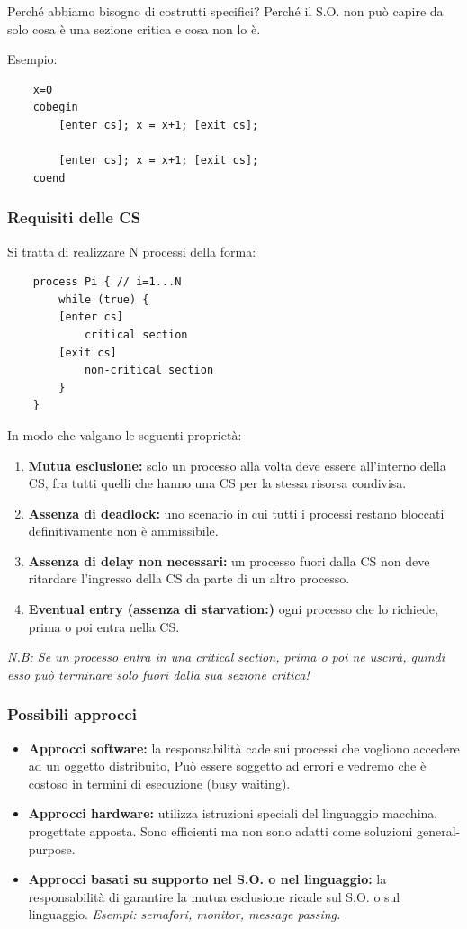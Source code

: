 Perché abbiamo bisogno di costrutti specifici? Perché il S.O. non può capire da solo cosa è una sezione critica e cosa non lo è.

Esempio:
\begin{lstlisting}
    x=0
    cobegin
        [enter cs]; x = x+1; [exit cs];

        [enter cs]; x = x+1; [exit cs];
    coend
\end{lstlisting}

\subsubsection{Requisiti delle CS}
Si tratta di realizzare N processi della forma:
\begin{lstlisting}
    process Pi { // i=1...N 
        while (true) {
        [enter cs]
            critical section
        [exit cs]
            non-critical section
        }
    }       
\end{lstlisting}
  
In modo che valgano le seguenti proprietà:
\begin{enumerate}
    \item \textbf{Mutua esclusione:} solo un processo alla volta deve essere all'interno della CS, fra tutti quelli che hanno una CS per la stessa risorsa condivisa.
    \item \textbf{Assenza di deadlock:} uno scenario in cui tutti i processi restano bloccati definitivamente non è ammissibile.
    \item \textbf{Assenza di delay non necessari:} un processo fuori dalla CS non deve ritardare l'ingresso della CS da parte di un altro processo.
    \item \textbf{Eventual entry (assenza di starvation:)} ogni processo che lo richiede, prima o poi entra nella CS.
\end{enumerate}
 \textit{N.B: Se un processo entra in una critical section, prima o poi ne uscirà, quindi esso può terminare solo fuori dalla sua sezione critica!}

 \subsubsection{Possibili approcci}
 \begin{itemize}
    \item \textbf{Approcci software:} la responsabilità cade sui processi che vogliono accedere ad un oggetto distribuito, Può essere soggetto ad errori e vedremo che è costoso in termini di esecuzione (busy waiting).
    \item \textbf{Approcci hardware:} utilizza istruzioni speciali del linguaggio macchina, progettate apposta. Sono efficienti ma non sono adatti come soluzioni general-purpose.
    \item \textbf{Approcci basati su supporto nel S.O. o nel linguaggio:} la responsabilità di garantire la mutua esclusione ricade sul S.O. o sul linguaggio.
    \textit{Esempi: semafori, monitor, message passing.}
 \end{itemize}
\newpage

